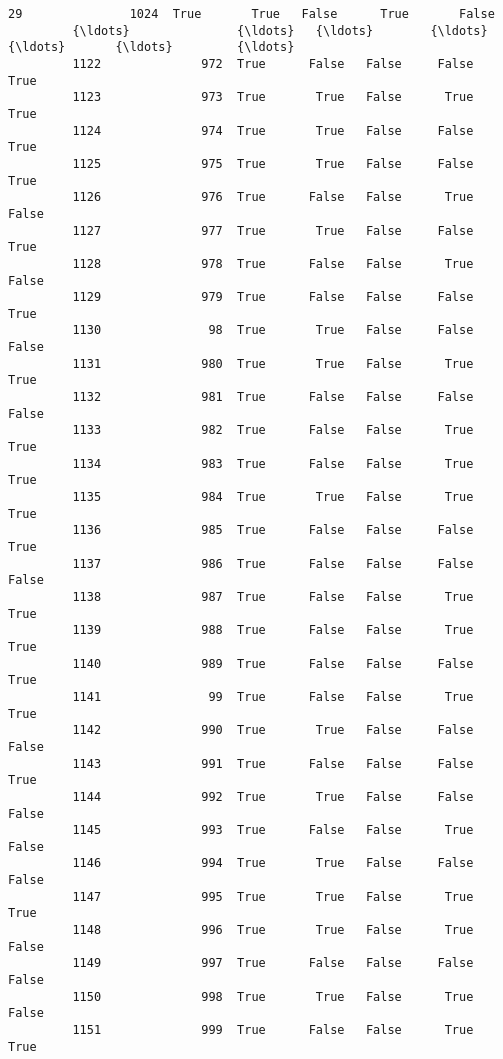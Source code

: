\documentclass[11pt]{article}
\begin{document}
\begin{Verbatim}[commandchars=\\\{\}]
         29               1024  True       True   False      True       False   
         {\ldots}               {\ldots}   {\ldots}        {\ldots}     {\ldots}       {\ldots}         {\ldots}   
         1122              972  True      False   False     False        True   
         1123              973  True       True   False      True        True   
         1124              974  True       True   False     False        True   
         1125              975  True       True   False     False        True   
         1126              976  True      False   False      True       False   
         1127              977  True       True   False     False        True   
         1128              978  True      False   False      True       False   
         1129              979  True      False   False     False        True   
         1130               98  True       True   False     False       False   
         1131              980  True       True   False      True        True   
         1132              981  True      False   False     False       False   
         1133              982  True      False   False      True        True   
         1134              983  True      False   False      True        True   
         1135              984  True       True   False      True        True   
         1136              985  True      False   False     False        True   
         1137              986  True      False   False     False       False   
         1138              987  True      False   False      True        True   
         1139              988  True      False   False      True        True   
         1140              989  True      False   False     False        True   
         1141               99  True      False   False      True        True   
         1142              990  True       True   False     False       False   
         1143              991  True      False   False     False        True   
         1144              992  True       True   False     False       False   
         1145              993  True      False   False      True       False   
         1146              994  True       True   False     False       False   
         1147              995  True       True   False      True        True   
         1148              996  True       True   False      True       False   
         1149              997  True      False   False     False       False   
         1150              998  True       True   False      True       False   
         1151              999  True      False   False      True        True   
         

\end{Verbatim}
\end{document}
